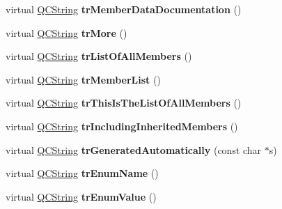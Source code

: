 \begin{DoxyCompactItemize}
\item 
\hypertarget{class_translator_swedish_a147916b8e7bfa480c305c89296a30b27}{virtual \hyperlink{class_q_c_string}{Q\-C\-String} {\bfseries tr\-Member\-Data\-Documentation} ()}\label{class_translator_swedish_a147916b8e7bfa480c305c89296a30b27}

\item 
\hypertarget{class_translator_swedish_ad353f5016f330b5494c0722bd412e7da}{virtual \hyperlink{class_q_c_string}{Q\-C\-String} {\bfseries tr\-More} ()}\label{class_translator_swedish_ad353f5016f330b5494c0722bd412e7da}

\item 
\hypertarget{class_translator_swedish_a40c25671c7d3213108dc1b8d2b916a8e}{virtual \hyperlink{class_q_c_string}{Q\-C\-String} {\bfseries tr\-List\-Of\-All\-Members} ()}\label{class_translator_swedish_a40c25671c7d3213108dc1b8d2b916a8e}

\item 
\hypertarget{class_translator_swedish_a5f788c561be2a2386720266688ad7561}{virtual \hyperlink{class_q_c_string}{Q\-C\-String} {\bfseries tr\-Member\-List} ()}\label{class_translator_swedish_a5f788c561be2a2386720266688ad7561}

\item 
\hypertarget{class_translator_swedish_a011ff392bb2087e2804dc648db7b3bdd}{virtual \hyperlink{class_q_c_string}{Q\-C\-String} {\bfseries tr\-This\-Is\-The\-List\-Of\-All\-Members} ()}\label{class_translator_swedish_a011ff392bb2087e2804dc648db7b3bdd}

\item 
\hypertarget{class_translator_swedish_ae6babe31ac1979ada5737392536bd239}{virtual \hyperlink{class_q_c_string}{Q\-C\-String} {\bfseries tr\-Including\-Inherited\-Members} ()}\label{class_translator_swedish_ae6babe31ac1979ada5737392536bd239}

\item 
\hypertarget{class_translator_swedish_a25156a73baa8406a915eaa5a6824b359}{virtual \hyperlink{class_q_c_string}{Q\-C\-String} {\bfseries tr\-Generated\-Automatically} (const char $\ast$s)}\label{class_translator_swedish_a25156a73baa8406a915eaa5a6824b359}

\item 
\hypertarget{class_translator_swedish_a50df17e22ad96870c7937be7e1ab8dfc}{virtual \hyperlink{class_q_c_string}{Q\-C\-String} {\bfseries tr\-Enum\-Name} ()}\label{class_translator_swedish_a50df17e22ad96870c7937be7e1ab8dfc}

\item 
\hypertarget{class_translator_swedish_a5b1d2d5c6825641661ff2cfaeb84307e}{virtual \hyperlink{class_q_c_string}{Q\-C\-String} {\bfseries tr\-Enum\-Value} ()}\label{class_translator_swedish_a5b1d2d5c6825641661ff2cfaeb84307e}


\end{DoxyCompactItemize}
